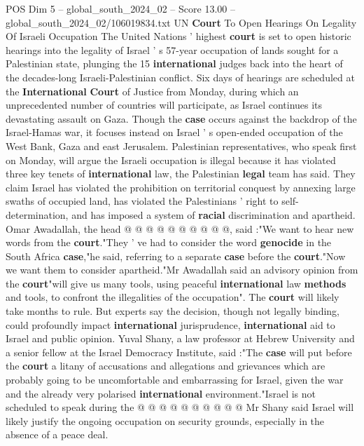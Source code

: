 \begin{textsample}{POS Dim 5 – global\_south\_2024\_02 – Score 13.00 – global\_south\_2024\_02/106019834.txt}  \label{ex:f5_pos_199}
UN \textbf{Court} To Open Hearings On Legality Of Israeli Occupation The United Nations ' highest \textbf{court} is set to open historic hearings into the legality of Israel ' s 57-year occupation of lands sought for a Palestinian state, plunging the 15 \textbf{international} judges back into the heart of the decades-long Israeli-Palestinian conflict.
Six days of hearings are scheduled at the \textbf{International} \textbf{Court} of Justice from Monday, during which an unprecedented number of countries will participate, as Israel continues its devastating assault on Gaza.
Though the \textbf{case} occurs against the backdrop of the Israel-Hamas war, it focuses instead on Israel ' s open-ended occupation of the West Bank, Gaza and east Jerusalem.
Palestinian representatives, who speak first on Monday, will argue the Israeli occupation is illegal because it has violated three key tenets of \textbf{international} law, the Palestinian \textbf{legal} team has said.
They claim Israel has violated the prohibition on territorial conquest by annexing large swaths of occupied land, has violated the Palestinians ' right to self-determination, and has imposed a system of \textbf{racial} discrimination and apartheid.
Omar Awadallah, the head @ @ @ @ @ @ @ @ @ @, said :"We want to hear new words from the \textbf{court}."They ' ve had to consider the word \textbf{genocide} in the South Africa \textbf{case},"he said, referring to a separate \textbf{case} before the \textbf{court}."Now we want them to consider apartheid."Mr Awadallah said an advisory opinion from the \textbf{court}"will give us many tools, using peaceful \textbf{international} law \textbf{methods} and tools, to confront the illegalities of the occupation".
The \textbf{court} will likely take months to rule.
But experts say the decision, though not legally binding, could profoundly impact \textbf{international} jurisprudence, \textbf{international} aid to Israel and public opinion.
Yuval Shany, a law professor at Hebrew University and a senior fellow at the Israel Democracy Institute, said :"The \textbf{case} will put before the \textbf{court} a litany of accusations and allegations and grievances which are probably going to be uncomfortable and embarrassing for Israel, given the war and the already very polarised \textbf{international} environment."Israel is not scheduled to speak during the @ @ @ @ @ @ @ @ @ @ Mr Shany said Israel will likely justify the ongoing occupation on security grounds, especially in the absence of a peace deal.

\end{textsample}
